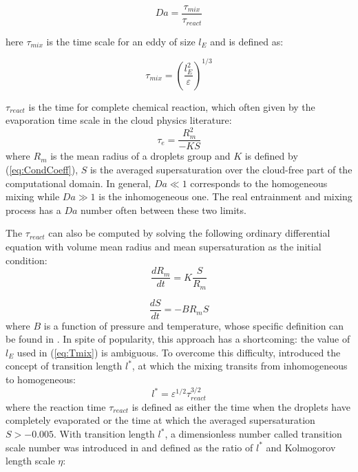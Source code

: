 \documentclass[draft,jgrga]{AGUTeX}
\begin{document}
\begin{article}
\begin{equation}
Da=\frac{\tau_{mix}}{\tau_{react}}\label{eq:DaNumber}
\end{equation}


here $\tau_{mix}$ is the time scale for an eddy of size $l_E$ and is defined as:

\begin{equation}
\tau_{mix}=(\frac{l_E^{2}}{\varepsilon})^{1/3}\label{eq:Tmix}
\end{equation}

$\tau_{react}$ is the time for complete chemical reaction, which often given by the evaporation time scale in the cloud physics literature:
\begin{equation}
\tau_{e}=\frac{R_{m}^{2}}{-KS}\label{eq:Tevap}
\end{equation}
where $R_{m}$ is the mean radius of a droplets group and $K$ is defined
by (\ref{eq:CondCoeff}), $S$ is the averaged supersaturation over
the cloud-free part of the computational domain. In general, $Da\ll1$ corresponds to the homogeneous mixing while $Da\gg1$ is the inhomogeneous one. The real entrainment and mixing process has a $Da$ number often between
these two limits.

The $\tau_{react}$ can also be computed by solving the following ordinary differential equation with volume mean radius and mean supersaturation as the initial condition:
\begin{equation}
\frac{dR_{m}}{dt}=K\frac{S}{R_{m}}\label{eq:DiffR}
\end{equation}

\begin{equation}
\frac{dS}{dt}=-BR_{m}S\label{eq:DiffSuper}
\end{equation}
where $B$ is a function of pressure and temperature, whose specific definition can be found in \cite{Chunsong11}. In spite of popularity, this approach has a shortcoming:
the value of $l_E$ used in (\ref{eq:Tmix}) is ambiguous. To overcome this difficulty, \cite{Lehmann09} introduced the concept of transition length $l^{*}$, at which the mixing transits from inhomogeneous to homogeneous:
\begin{equation}
l^{*}=\varepsilon^{1/2}\tau_{react}^{3/2}\label{eq:TransL}
\end{equation}
where the reaction time $\tau_{react}$ is defined as either the time when the droplets have completely evaporated or the time at which the averaged supersaturation $S>-0.005$. 
With transition length $l^{*}$, a dimensionless number called transition scale number was introduced in \cite{Chunsong13} and defined as the ratio of $l^{*}$ and Kolmogorov length scale $\eta$:


\end{article}
\end{document}
